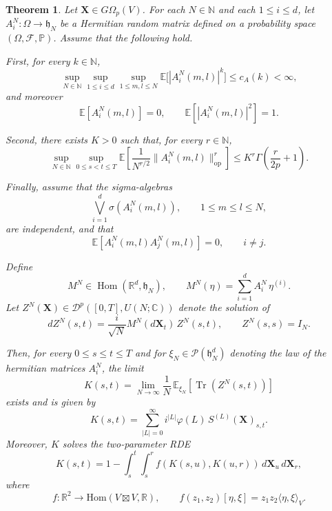 \documentclass{article}%
\newtheorem{theorem}{Theorem}
\begin{document}
\begin{theorem}\label{theorem_existence}
Let $\mathbf X \in G\Omega_p(V)$. For each $N\in\mathbb N$ and each $1\le i\le d$, let
\(
A_i^N:\Omega\to\mathfrak h_N
\)
be a Hermitian random matrix defined on a probability space $(\Omega,\mathcal F,\mathbb P)$. Assume that the following hold.

First, for every $k\in\mathbb N$,
\[
\sup_{N\in\mathbb N}\sup_{1\le i\le d}\sup_{1\le m,l\le N}
\mathbb E\big[|A_i^N(m,l)|^k\big]\le c_A(k)<\infty,
\]
and moreover
\[
\mathbb E[A_i^N(m,l)]=0,
\qquad
\mathbb E[|A_i^N(m,l)|^2]=1.
\]

Second, there exists $K>0$ such that, for every $r\in\mathbb N$,
\[
\sup_{N\in\mathbb N}\sup_{0\le s<t\le T}
\mathbb E\!\left[\frac{1}{N^{r/2}}\|A_i^N(m,l)\|_{\mathrm{op}}^r\right]
\le K^r\Gamma\!\left(\frac{r}{2p}+1\right).
\]

Finally, assume that the sigma-algebras
\[
\bigvee_{i=1}^d \sigma(A_i^N(m,l)),
\qquad 1\le m\le l\le N,
\]
are independent, and that
\[
\mathbb E\!\left[A_i^N(m,l)A_j^N(m,l)\right]=0,
\qquad i\ne j.
\]

Define
\[
M^N\in\operatorname{Hom}(\mathbb R^d,\mathfrak h_N),
\qquad
M^N(\eta)=\sum_{i=1}^d A_i^N\,\eta^{(i)}.
\]
Let $Z^N(\mathbf X)\in\mathcal D^p([0,T],U(N;\mathbb C))$ denote the solution of
\begin{equation} \label{eq:36}
dZ^N(s,t)=\frac{i}{\sqrt N}M^N(d\mathbf X_t)\,Z^N(s,t),
\qquad
Z^N(s,s)=I_N.
\end{equation}

Then, for every $0\le s\le t\le T$ and for $\xi_N \in \mathcal{P}(\mathfrak{h}^d_N)$ denoting the law of the hermitian matrices $A^N_i$, the limit
\[
K(s,t)=\lim_{N\to\infty}\frac1N\,
\mathbb E_{\xi_N}\!\left[\operatorname{Tr}(Z^N(s,t))\right]
\]
exists and is given by
\begin{equation}\label{rough_SD_rep}
K(s,t)=\sum_{|L|=0}^\infty i^{|L|}\varphi(L)\,S^{(L)}(\mathbf X)_{s,t}.
\end{equation}
Moreover, \(K\) solves the two-parameter RDE
\begin{equation}\label{SD_with_f}
K(s,t)=1-\int_s^t\int_s^r f(K(s,u),K(u,r))\,d\mathbf X_u\,d\mathbf X_r,
\end{equation}
where
\[
f:\mathbb R^2\to \mathrm{Hom}(V\boxtimes V, \mathbb{R}),
\qquad
f(z_1,z_2)[\eta,\xi]=z_1z_2\langle \eta,\xi\rangle_V.
\]
\end{theorem}
\end{document}
